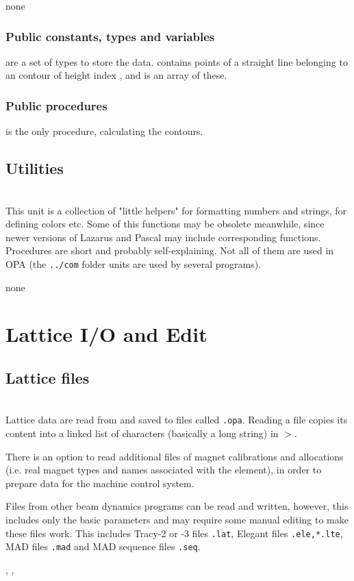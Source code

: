 \documentclass[12pt]{article}
\newcommand\code[1]{{\tt #1}}
\newcommand\guico[1]{{\color{blue}\code{#1}}}
\newcommand{\unico}[1]{{\color{burntorange}\code{#1}}}
\newcommand{\grcod}[2]{\opagui{#1}$>$\guico{#2}}
\newcommand{\opagui}[1]{\colorbox{blue!20}{{\color{black}\code{#1}}}}
\newcommand{\opauni}[1]{\colorbox{orange!30}{{\color{black}\code{#1}}}}
\newcommand{\ounih}[2]{\subsection{\label{#2}#1}{\Huge\opauni{#2}}\\}
\newcommand{\ouni}[1]{\hyperref[#1]{\opauni{#1}}}
\newcommand{\uses}[1]{\flushleft {\bf Uses:} #1}
\newcommand{\desc}[1]{#1}
\newcommand{\pvar}[1]{\subsubsection*{Public constants, types and variables} #1}
\newcommand{\ppro}[1]{\subsubsection*{Public procedures} #1}
\begin{document}
\uses{none}
\pvar{
\unico{Con...} are a set of types to store the data. \unico{ConLinesType} contains points of a straight line belonging to an contour of height index \unico{ih}, and \unico{ConLinesArray} is an array of these.
}
\ppro{
\unico{Conrec} is the only procedure, calculating the contours.}

\ounih{Utilities}{../com/asaux}

\desc{This unit is a collection of "little helpers" for formatting numbers and strings, for defining colors etc. Some of this functions may be obsolete meanwhile, since newer versions of Lazarus and Pascal may include corresponding functions.
Procedures are short and probably self-explaining. Not all of them are used in OPA (the \code{../com} folder units are used by several programs).}

\uses{none}

\section{\label{secedit}Lattice I/O and Edit} 

\ounih{Lattice files}{latfilelib}

\desc{Lattice data are read from and saved to files called \code{*.opa}. Reading a file copies its content into a linked list of characters (basically a long string) in \grcod{opamenu}{ReadFile}.

There is an option to read additional files of magnet calibrations and allocations (i.e. real magnet types and names associated with the element), in order to prepare data for the machine control system.

Files from other beam dynamics programs can be read and written, however, this includes only the basic parameters and may require some manual editing to make these files work. This includes Tracy-2 or -3 files \code{*.lat}, Elegant files \code{*.ele,*.lte}, MAD files \code{*.mad} and MAD sequence files \code{*.seq}.
}

\uses{\ouni{globlib}, \ouni{mathlib}, \ouni{../com/asaux}}
\end{document}
